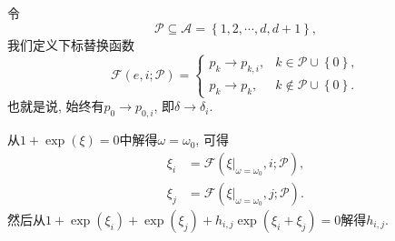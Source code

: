 \documentclass{article}
\newcommand{\sbrace}[1]{\left(#1\right)}
\newcommand{\bbrace}[1]{\left\{#1\right\}}
\newcommand{\eval}[2]{\left.{#1}\right|_{#2}}
\newcommand{\ALLP}{\mathcal{A}}
\newcommand{\PS}{\mathcal{P}}
\begin{document}
令
\begin{equation}
\PS\subseteq \ALLP=\bbrace{1,2,\cdots,d,d+1} ,
\end{equation}
我们定义下标替换函数
\begin{equation}
\mathcal F\sbrace{e,i;\PS}=\left\{\begin{array}{ll}
  p_k \to p_{k,i}, & k \in \PS \cup \bbrace{0},\\ 
  p_k \to p_k , & k \not\in\PS \cup \bbrace{0}.
\end{array}\right.
\end{equation}
也就是说, 始终有$p_0\to p_{0,i}$, 即$\delta\to \delta_i$. 

从$1+\exp(\xi)=0$中解得$\omega=\omega_0$, 可得 
\begin{equation}
\begin{aligned}
  \xi_i&=\mathcal{F}\sbrace{\eval{\xi}{\omega=\omega_0},i;\PS} ,\\
  \xi_j&=\mathcal{F}\sbrace{\eval{\xi}{\omega=\omega_0},j;\PS} .
\end{aligned}
\end{equation}
然后从$1+\exp(\xi_i)+\exp(\xi_j)+h_{i,j}\exp(\xi_i+\xi_j)=0$解得$h_{i,j}$. 
\end{document}
